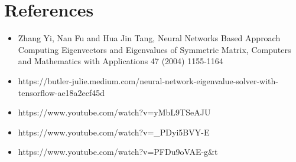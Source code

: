 \documentclass{article}
\begin{document}
\section{References}
\begin{itemize}
    \item Zhang Yi, Nan Fu and Hua Jin Tang, Neural Networks Based Approach Computing Eigenvectors and Eigenvalues of Symmetric Matrix, Computers and Mathematics with Applications 47 (2004) 1155-1164
    \item https://butler-julie.medium.com/neural-network-eigenvalue-solver-with-tensorflow-ae18a2ecf45d
    \item https://www.youtube.com/watch?v=yMbL9TSeAJU
    \item https://www.youtube.com/watch?v=\_PDyi5BVY-E
    \item https://www.youtube.com/watch?v=PFDu9oVAE-g\&t
\end{itemize}
\end{document}
